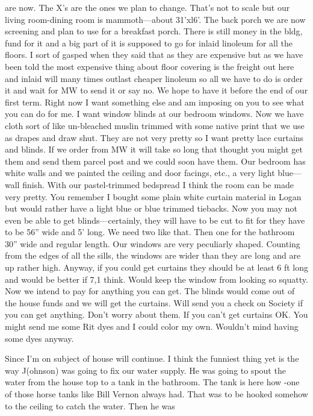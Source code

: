 \documentclass[
]{book}
\begin{document}
are now. The X's are the ones we plan to change. That's not to scale but our living room-dining room is mammoth---about 31'xl6'. The back porch we are now screening and plan to use for a breakfast porch. There is still money in the bldg, fund for it and a big part of it is supposed to go for inlaid linoleum for all the floors. I sort of gasped when they said that as they are expensive but as we have been told the most expensive thing about floor covering is the freight out here and inlaid will many times outlast cheaper linoleum so all we have to do is order it and wait for MW to send it or say no. We hope to have it before the end of our first term. Right now I want something else and am imposing on you to see what you can do for me. I want window blinds at our bedroom windows. Now we have cloth sort of like un-bleached muslin trimmed with some native print that we use as drapes and draw shut. They are not very pretty so I want pretty lace curtains and blinds. If we order from MW it will take so long that thought you might get them and send them parcel post and we could soon have them. Our bedroom has white walls and we painted the ceiling and door facings, etc., a very light blue---wall finish. With our pastel-trimmed bedspread I think the room can be made very pretty. You remember I bought some plain white curtain material in Logan but would rather have a light blue or blue trimmed tiebacks. Now you may not even be able to get blinds---certainly, they will have to be cut to fit for they have to be 56'' wide and 5' long. We need two like that. Then one for the bathroom 30'' wide and regular length. Our windows are very peculiarly shaped. Counting from the edges of all the sills, the windows are wider than they are long and are up rather high. Anyway, if you could get curtains they should be at least 6 ft long and would be better if 7,1 think. Would keep the window from looking so squatty. Now we intend to pay for anything you can get. The blinds would come out of the house funds and we will get the curtains. Will send you a check on Society if you can get anything. Don't worry about them. If you can't get curtains OK. You might send me some Rit dyes and I could color my own. Wouldn't mind having some dyes anyway.

Since I'm on subject of house will continue. I think the funniest thing yet is the way J(ohnson) was going to fix our water supply. He was going to spout the water from the house top to a tank in the bathroom. The tank is here how -one of those horse tanks like Bill Vernon always had. That was to be hooked somehow to the ceiling to catch the water. Then he was
\end{document}
